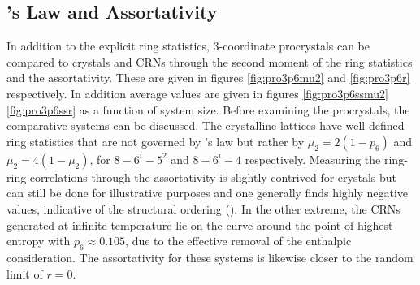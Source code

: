 \subsection{\lm's Law and Assortativity}

In addition to the explicit ring statistics, 3\--coordinate procrystals can be compared to crystals and CRNs through the second moment of the ring statistics and the assortativity.
These are given in figures \ref{fig:pro3p6mu2} and \ref{fig:pro3p6r} respectively.
In addition average values are given in figures \ref{fig:pro3p6ssmu2} \ref{fig:pro3p6ssr} as a function of system size.
Before examining the procrystals, the comparative systems can be discussed.
The crystalline lattices have well defined ring statistics that are not governed by \lm's law but rather by $\mu_2=2\left(1-p_6\right)$ and $\mu_2=4\left(1-\mu_2\right)$, for $8-6^i-5^2$ and $8-6^i-4$ respectively. 
Measuring the ring\--ring correlations through the assortativity is slightly contrived for crystals but can still be done for illustrative purposes and one generally finds highly negative values, indicative of the structural ordering ().
In the other extreme, the CRNs generated at infinite temperature lie on the \lm{} curve around the point of highest entropy \ie{} with $p_6\approx 0.105$, due to the effective removal of the enthalpic consideration.
The assortativity for these systems is likewise closer to the random limit of $r=0$.

